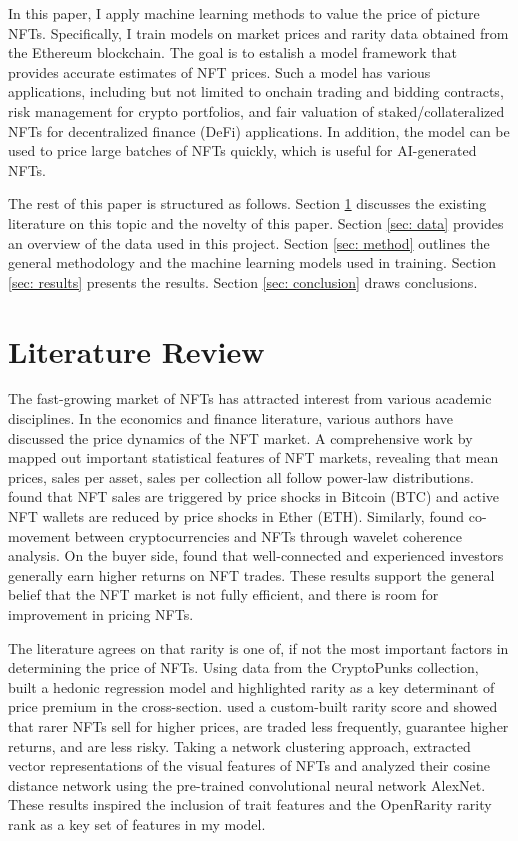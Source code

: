 \documentclass[12pt]{article}
\begin{document}
In this paper, I apply machine learning methods to value the price of picture NFTs. Specifically, I train models on market prices and rarity data obtained from the Ethereum blockchain. The goal is to estalish a model framework that provides accurate estimates of NFT prices. Such a model has various applications, including but not limited to onchain trading and bidding contracts, risk management for crypto portfolios, and fair valuation of staked/collateralized NFTs for decentralized finance (DeFi) applications. In addition, the model can be used to price large batches of NFTs quickly, which is useful for AI-generated NFTs.

The rest of this paper is structured as follows. Section \ref{sec: lit_review} discusses the existing literature on this topic and the novelty of this paper. Section \ref{sec: data} provides an overview of the data used in this project. Section \ref{sec: method} outlines the general methodology and the machine learning models used in training. Section \ref{sec: results} presents the results. Section \ref{sec: conclusion} draws conclusions.


\section{Literature Review}
\label{sec: lit_review}
The fast-growing market of NFTs has attracted interest from various academic disciplines. In the economics and finance literature, various authors have discussed the price dynamics of the NFT market. A comprehensive work by \citet{nadini2021mapping} mapped out important statistical features of NFT markets, revealing that mean prices, sales per asset, sales per collection all follow power-law distributions. \citet{ante2022non} found that NFT sales are triggered by price shocks in Bitcoin (BTC) and active NFT wallets are reduced by price shocks in  Ether (ETH). Similarly, \citet{dowling2022non} found co-movement between cryptocurrencies and NFTs through wavelet coherence analysis. On the buyer side, \citet{kong2021alternative,oh2022investor} found that well-connected and experienced investors generally earn higher returns on NFT trades. These results support the general belief that the NFT market is not fully efficient, and there is room for improvement in pricing NFTs. 

The literature agrees on that rarity is one of, if not the most important factors in determining the price of NFTs. Using data from the CryptoPunks collection, \citet{kong2021alternative} built a hedonic regression model and highlighted rarity as a key determinant of price premium in the cross-section. \citet{mekacher2022heterogeneous} used a custom-built rarity score and showed that rarer NFTs sell for higher prices, are traded less frequently, guarantee higher returns, and are less risky. Taking a network clustering approach, \citet{nadini2021mapping} extracted vector representations of the visual features of NFTs and analyzed their cosine distance network using the pre-trained convolutional neural network AlexNet. These results inspired the inclusion of trait features and the OpenRarity rarity rank as a key set of features in my model.
\end{document}
